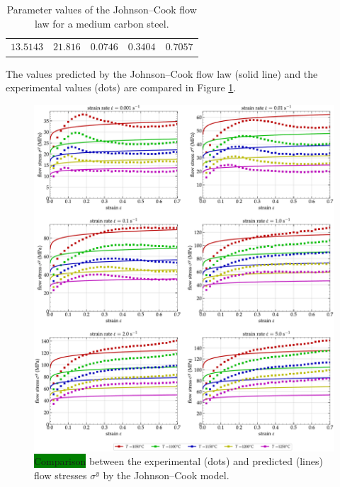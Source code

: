 \documentclass[metals,article,accept,pdftex,moreauthors]{Definitions/mdpi}
\newcommand{\hlok}[1]{\colorbox{green}{#1}}
\begin{document}
\begin{table}[H]

\caption{Parameter values of the Johnson--Cook flow law for a medium carbon steel.}
\begin{tabularx}{\textwidth}{CCCCC}
\toprule
{} &  &  &  &  \\
\midrule
$13.5143$ & $21.816$ & $0.0746$ & $0.3404$ & $0.7057$ \\
\bottomrule
\end{tabularx}
\label{tab:JC}
\end{table}

The values predicted by the Johnson--Cook flow law (solid line) and the experimental values (dots) are compared in Figure \ref{fig:CompExp-JC-6}.
\begin{figure}[H]

\includegraphics[width=0.99\columnwidth]{Figures/CompExp-JC-6}
\caption{\hlok{Comparison} %
 between the experimental (dots) and predicted (lines) flow stresses $\sigma^y$ by the Johnson--Cook model.}
\label{fig:CompExp-JC-6}
\end{figure}
\end{document}
